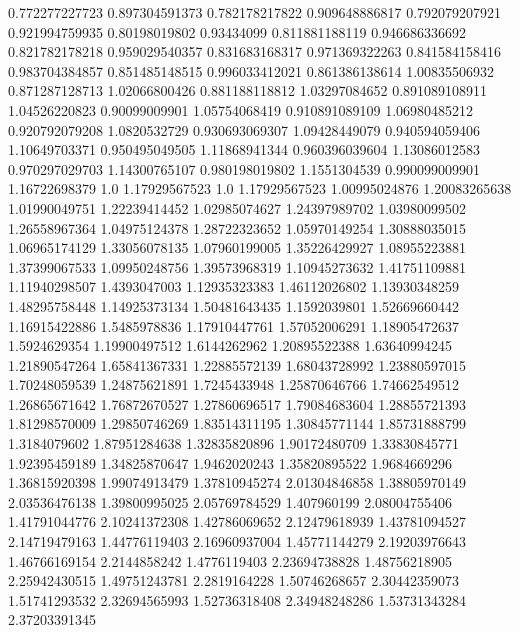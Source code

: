  0.772277227723   0.897304591373
 0.782178217822   0.909648886817
 0.792079207921   0.921994759935
  0.80198019802       0.93434099
 0.811881188119   0.946686336692
 0.821782178218   0.959029540357
 0.831683168317   0.971369322263
 0.841584158416   0.983704384857
 0.851485148515   0.996033412021
 0.861386138614    1.00835506932
 0.871287128713    1.02066800426
 0.881188118812    1.03297084652
 0.891089108911    1.04526220823
  0.90099009901    1.05754068419
 0.910891089109    1.06980485212
 0.920792079208     1.0820532729
 0.930693069307    1.09428449079
 0.940594059406    1.10649703371
 0.950495049505    1.11868941344
 0.960396039604    1.13086012583
 0.970297029703    1.14300765107
 0.980198019802     1.1551304539
 0.990099009901    1.16722698379
            1.0    1.17929567523
            1.0    1.17929567523
  1.00995024876    1.20083265638
  1.01990049751    1.22239414452
  1.02985074627    1.24397989702
  1.03980099502    1.26558967364
  1.04975124378    1.28722323652
  1.05970149254    1.30888035015
  1.06965174129    1.33056078135
  1.07960199005    1.35226429927
  1.08955223881    1.37399067533
  1.09950248756    1.39573968319
  1.10945273632    1.41751109881
  1.11940298507     1.4393047003
  1.12935323383    1.46112026802
  1.13930348259    1.48295758448
  1.14925373134    1.50481643435
   1.1592039801    1.52669660442
  1.16915422886     1.5485978836
  1.17910447761    1.57052006291
  1.18905472637     1.5924629354
  1.19900497512     1.6144262962
  1.20895522388    1.63640994245
  1.21890547264    1.65841367331
  1.22885572139    1.68043728992
  1.23880597015    1.70248059539
  1.24875621891     1.7245433948
  1.25870646766    1.74662549512
  1.26865671642    1.76872670527
  1.27860696517    1.79084683604
  1.28855721393    1.81298570009
  1.29850746269    1.83514311195
  1.30845771144    1.85731888799
   1.3184079602    1.87951284638
  1.32835820896    1.90172480709
  1.33830845771    1.92395459189
  1.34825870647     1.9462020243
  1.35820895522     1.9684669296
  1.36815920398    1.99074913479
  1.37810945274    2.01304846858
  1.38805970149    2.03536476138
  1.39800995025    2.05769784529
    1.407960199    2.08004755406
  1.41791044776    2.10241372308
  1.42786069652    2.12479618939
  1.43781094527    2.14719479163
  1.44776119403    2.16960937004
  1.45771144279    2.19203976643
  1.46766169154     2.2144858242
   1.4776119403    2.23694738828
  1.48756218905    2.25942430515
  1.49751243781     2.2819164228
  1.50746268657    2.30442359073
  1.51741293532    2.32694565993
  1.52736318408    2.34948248286
  1.53731343284    2.37203391345
